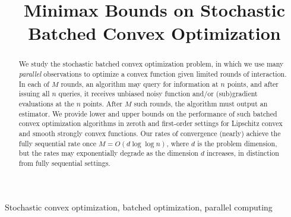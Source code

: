 \documentclass[final,12pt]{colt2018} %
\title[Minimax Bounds on Stochastic Batched Convex Optimization]{Minimax Bounds on Stochastic Batched Convex Optimization}
\begin{document}
\maketitle 

\begin{abstract}
  We study the stochastic batched convex optimization problem, in which we
  use many \emph{parallel} observations to optimize a convex function given
  limited rounds of interaction.  In each of $M$ rounds, an algorithm may
  query for information at $n$ points, and after issuing all $n$ queries, it
  receives unbiased noisy function and/or (sub)gradient evaluations at the
  $n$ points.  After $M$ such rounds, the algorithm must output an
  estimator.  We provide lower and upper bounds on the performance of such
  batched convex optimization algorithms in zeroth and first-order settings
  for Lipschitz convex and smooth strongly convex functions.  Our rates of
  convergence (nearly) achieve the fully sequential rate once $M = O(d \log
  \log n)$, where $d$ is the problem dimension, but the rates may
  exponentially degrade as the dimension $d$ increases, in distinction from
  fully sequential settings.
\end{abstract}

\begin{keywords}
Stochastic convex optimization, batched optimization, parallel computing
\end{keywords}




%






\newpage
\appendix

%




\end{document}
